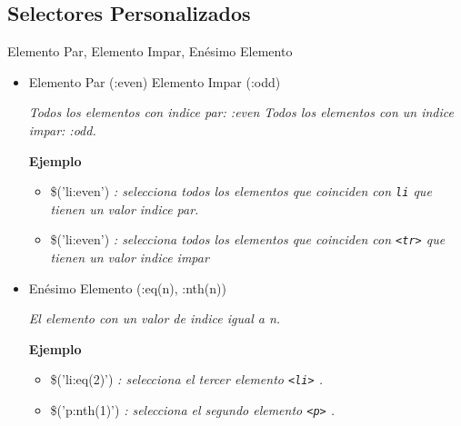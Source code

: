 \subsection{Selectores Personalizados} %

\begin{frame}[fragile]{Elemento Par,  Elemento Impar, Enésimo Elemento}
\begin{itemize}
\item Elemento Par (:even) Elemento Impar (:odd) 

\textit{Todos los elementos con indice par: 
  :even
Todos los elementos con un indice impar:
  :odd.}

\textbf{Ejemplo}  
\begin{itemize}
    \item \$('li:even') \textit{: selecciona todos los elementos que coinciden
    con \texttt{li} que tienen un valor indice par.}
    \item \$('li:even') \textit{: selecciona todos los elementos que coinciden
    con \texttt{<tr>} que tienen un valor indice impar}
\end{itemize}

\item Enésimo Elemento (:eq(n), :nth(n)) 

\textit{El elemento con un valor de indice igual a n.}

\textbf{Ejemplo}
\begin{itemize}
    \item \$('li:eq(2)') \textit{: selecciona el tercer elemento \texttt{<li>} .}
    \item \$('p:nth(1)') \textit{: selecciona el segundo elemento \texttt{<p>} .}
\end{itemize}
\end{itemize}
\end{frame}

